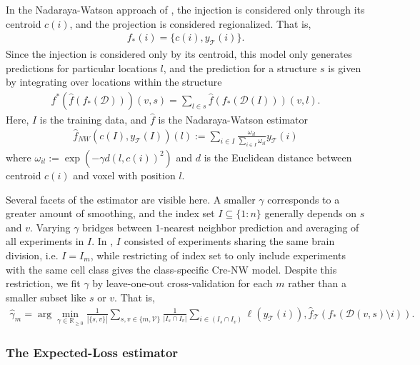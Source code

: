 In the Nadaraya-Watson approach of \citet{Knox2019-ot}, the injection is considered only through its centroid $c(i)$, and the projection is considered regionalized.
That is,
\begin{eqnarray*}
f_*(i) = \{c(i), y_{\mathcal T}(i)\}.
\end{eqnarray*}
Since the injection is considered only by its centroid, this model only generates predictions for particular locations $l$, and the prediction for a structure $s$ is given by integrating over locations within the structure
\begin{eqnarray*}
\label{eq:regionalize}
f^* (\hat f (f_*(\mathcal D))) (v,s) = \sum_{l \in s} \hat f (f_*(\mathcal D(I))) (v,l ).
\end{eqnarray*}
Here, $I$ is the training data, and $\hat f$ is the Nadaraya-Watson estimator
\begin{eqnarray*}
\hat f_{NW}( c(I) , y_{\mathcal T}(I) ) (l) :=  \sum_{i \in I} \frac{ \omega_{i l}}{\sum_{i \in I} \omega_{i l}} y_{\mathcal T}(i)
\end{eqnarray*}
where $\omega_{i l } := \exp( - \gamma d( l , c(i))^2 )$ and $d$ is the Euclidean distance between centroid $c(i)$ and voxel with position $l$.

Several facets of the estimator are visible here. 
A smaller $\gamma$ corresponds to a greater amount of smoothing, and the index set $I \subseteq  \{1:n\}$ generally depends on $s$ and $v$.
Varying $\gamma$   bridges between $1$-nearest neighbor prediction and averaging of all experiments in $I$.
In \citet{Knox2019-ot}, $I$ consisted of experiments sharing the same brain division, i.e. $I = I_m$, while restricting of index set to only include experiments with the same cell class gives the class-specific Cre-NW model.
Despite this restriction, we fit $\gamma$ by leave-one-out cross-validation for each $m$ rather than a smaller subset like $s$ or $v$.
That is,
\begin{eqnarray}
\label{eq:gamma_sel}
\widehat \gamma_m =  \arg \min_{\gamma \in \mathbb R_{\geq 0}} \frac{1}{|\{s,v\}|} \sum_{s,v \in \{m,\mathcal V\}} \frac{1}{ |I_{s} \cap I_v |} \sum_{i \in (I_{s} \cap I_v ) } \ell (y_{\mathcal T}(i)), \hat f_{\mathcal T} (f_*(\mathcal D(v,s) \setminus i)) .
\end{eqnarray}

\newpage
\subsubsection{The Expected-Loss estimator}

